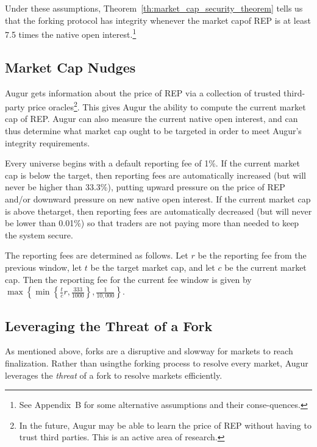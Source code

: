\documentclass[12pt,floatfix,reprint,nofootinbib,amsmath,amssymb,epsfig,pre,floats,letterpaper,groupedaffiliation]{revtex4-1}
\theoremstyle{definition}
\theoremstyle{definition}
\begin{document}
Under these assumptions, Theorem~\ref{th:market_cap_security_theorem} tells us that the forking protocol has integrity whenever the market cap\linebreak of REP is at least 7.5 times the native open interest.\footnote{See Appendix~B for some alternative assumptions and their conse-\linebreak quences.}

\subsection{Market Cap Nudges}\label{section:market_cap_nudges}

Augur gets information about the price of REP via a collection of trusted third-party price oracles\footnote{In the future, Augur may be able to learn the price of REP without having to trust third parties. This is an active area of research.}. This gives Augur the ability to compute the current market cap of REP. Augur can also measure the current native open interest, and can thus determine what market cap ought to be targeted in order to meet Augur's integrity requirements.

Every universe begins with a default reporting fee of 1\%. If the current market cap is below the target, then reporting fees are automatically increased (but will never be higher than 33.3\%), putting upward pressure on the price of REP and/or downward pressure on new native open interest. If the current market cap is above the\linebreak target, then reporting fees are automatically decreased (but will never be lower than 0.01\%) so that traders are not paying more than needed to keep the system secure.

The reporting fees are determined as follows. Let $r$ be the reporting fee from the previous window, let $t$ be the target market cap, and let $c$ be the current market cap. Then the reporting fee for the current fee window is given by $\max\left\{ \min\left\{\frac{t}{c}r, \frac{333}{1000}\right\} , \frac{1}{10,000}\right\}$.

\subsection{Leveraging the Threat of a Fork}\label{section:leveraging_the_threat_of_a_fork}

As mentioned above, forks are a disruptive and slow\linebreak way for markets to reach finalization. Rather than using\linebreak the forking process to resolve every market, Augur leverages the \textit{threat} of a fork to resolve markets efficiently.
\end{document}
